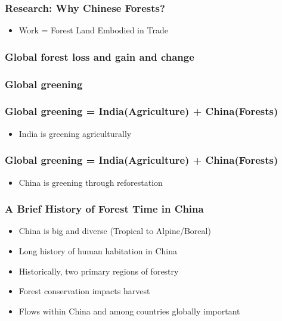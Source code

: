 \begin{frame}
  \frametitle{Research: Why Chinese Forests?}

  \begin{itemize}
\item Work = Forest Land Embodied in Trade
  \end{itemize}

\end{frame}

\begin{frame}
  \frametitle{Global forest loss and gain and change}



\end{frame}

\begin{frame}
  \frametitle{Global greening}



\end{frame}

\begin{frame}
  \frametitle{Global greening = India(Agriculture) + China(Forests)}

  \begin{itemize}
  \item India is greening agriculturally
  \end{itemize}

\end{frame}

\begin{frame}
  \frametitle{Global greening = India(Agriculture) + China(Forests)}

  \begin{itemize}
  \item China is greening through reforestation 
  \end{itemize}

\end{frame}

\begin{frame}
  \frametitle{A Brief History of Forest Time in China}

  \begin{itemize}
  \item China is big and diverse (Tropical to Alpine/Boreal)
  \item Long history of human habitation in China
  \item Historically, two primary regions of forestry
  \item Forest conservation impacts harvest
  \item Flows within China and among countries globally important
  \end{itemize}

\end{frame}

